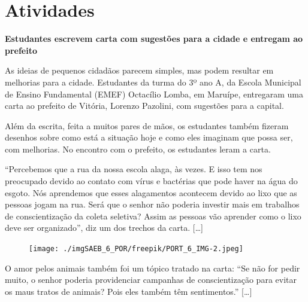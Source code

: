 
\section*{Atividades}

\hspace\parindent{Leia o texto a seguir e responda às questões de 1 a 4.}

\begin{myquote}
\begin{center}
\textbf{Estudantes escrevem carta com sugestões para a cidade e entregam
ao prefeito}
\end{center}

\medskip

As ideias de pequenos cidadãos parecem simples, mas podem resultar em
melhorias para a cidade. Estudantes da turma do 3º ano A, da Escola
Municipal de Ensino Fundamental (EMEF) Octacílio Lomba, em Maruípe,
entregaram uma carta ao prefeito de Vitória, Lorenzo Pazolini, com
sugestões para a capital.

Além da escrita, feita a muitos pares de mãos, os estudantes também
fizeram desenhos sobre como está a situação hoje e como eles imaginam
que possa ser, com melhorias. No encontro com o prefeito, os estudantes
leram a carta.

``Percebemos que a rua da nossa escola alaga, às vezes. E isso tem nos
preocupado devido ao contato com vírus e bactérias que pode haver na
água do esgoto. Nós aprendemos que esses alagamentos acontecem devido ao
lixo que as pessoas jogam na rua. Será que o senhor não poderia investir
mais em trabalhos de conscientização da coleta seletiva? Assim as
pessoas vão aprender como o lixo deve ser organizado'', diz um dos
trechos da carta. {[}\ldots{}{]}

\begin{figure}[H]

\centering\texttt{[image: ./imgSAEB\_6\_POR/freepik/PORT\_6\_IMG-2.jpeg]}

\end{figure}

O amor pelos animais também foi um tópico tratado na carta: ``Se não for
pedir muito, o senhor poderia providenciar campanhas de conscientização
para evitar os maus tratos de animais? Pois eles também têm
sentimentos.'' {[}\ldots{}{]}

\end{myquote}


